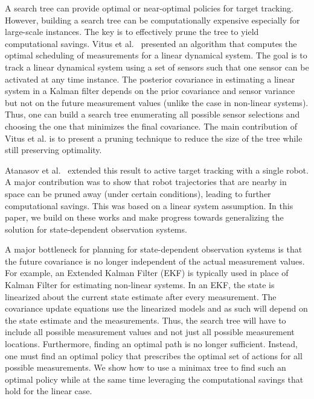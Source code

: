 \documentclass[journal]{IEEEtran}
\begin{document}
A search tree can provide optimal or near-optimal policies for target tracking. However, building a search tree can be computationally expensive especially for large-scale instances. The key is to effectively prune the tree to yield computational savings. Vitus et al.~\cite{vitus2012efficient} presented an algorithm that computes the optimal scheduling of measurements for a linear dynamical system. The goal is to track a linear dynamical system using a set of sensors such that one sensor can be activated at any time instance. The posterior covariance in estimating a linear system in a Kalman filter depends on the prior covariance and sensor variance but not on the future measurement values (unlike the case in non-linear systems). Thus, one can build a search tree enumerating all possible sensor selections and choosing the one that minimizes the final covariance. The main contribution of Vitus et al. is to present a pruning technique to reduce the size of the tree while still preserving optimality.

Atanasov et al.~\cite{atanasov2014information} extended this result to active target tracking with a single robot. A major contribution was to show that robot trajectories that are nearby in space can be pruned away (under certain conditions), leading to further computational savings. This was based on a linear system assumption. In this paper, we build on these works and make progress towards generalizing the solution for state-dependent observation systems.

A major bottleneck for planning for state-dependent observation systems is that the future covariance is no longer independent of the actual measurement values. For example, an Extended Kalman Filter (EKF) is typically used in place of Kalman Filter for estimating non-linear systems. In an EKF, the state is linearized about the current state estimate after every measurement. The covariance update equations use the linearized models and as such will depend on the state estimate and the measurements. Thus, the search tree will have to include all possible measurement values and not just all possible measurement locations. Furthermore, finding an optimal path is no longer sufficient. Instead, one must find an optimal policy that prescribes the optimal set of actions for all possible measurements. We show how to use a minimax tree to find such an optimal policy while at the same time leveraging the computational savings that hold for the linear case.

\end{document}
